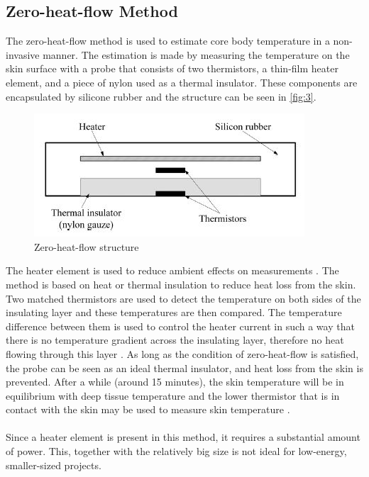 \subsection{Zero-heat-flow Method}
The zero-heat-flow method is used to estimate core body temperature in a non-invasive manner. The estimation is made by measuring the temperature on the skin surface with a probe that consists of two thermistors, a thin-film heater element, and a piece of nylon used as a thermal insulator. These components are encapsulated by silicone rubber and the structure can be seen in \autoref{fig:3}.
\begin{figure}[H]
	\centering
	\includegraphics[scale=0.8]{img/zero-heat-flow}
	\caption{Zero-heat-flow structure\cite{Chen2019}}
	\label{fig:3}
\end{figure} 
\noindent
The heater element is used to reduce ambient effects on measurements \cite{Matsunaga2020}. The method is based on heat or thermal insulation to reduce heat loss from the skin. Two matched thermistors are used to detect the temperature on both sides of the insulating layer and these temperatures are then compared. The temperature difference between them is used to control the heater current in such a way that there is no temperature gradient across the insulating layer, therefore no heat flowing through this layer \cite{Yamakage2003}. As long as the condition of zero-heat-flow is satisfied, the probe can be seen as an ideal thermal insulator, and heat loss from the skin is prevented. After a while (around 15 minutes), the skin temperature will be in equilibrium with deep tissue temperature and the lower thermistor that is in contact with the skin may be used to measure skin temperature \cite{Yamakage2003}.
\\
\\
Since a heater element is present in this method, it requires a substantial amount of power. This, together with the relatively big size is not ideal for low-energy, smaller-sized projects.

